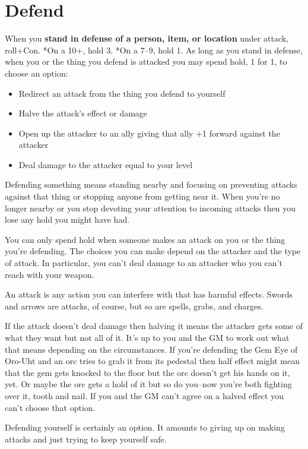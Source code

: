 \section*{Defend}
\HRule
When you \textbf{stand in defense of a person, item, or location}
under attack, roll+Con. *On a 10+, hold 3. *On a 7--9, hold 1. As long as you stand in defense, when you or the thing you defend is attacked you may spend hold, 1 for 1, to choose an option:
\begin{itemize}
\item Redirect an attack from the thing you defend to yourself
\item Halve the attack's effect or damage
\item Open up the attacker to an ally giving that ally +1 forward against the attacker
\item Deal damage to the attacker equal to your level
\end{itemize}
\HRule

Defending something means standing nearby and focusing on preventing attacks against that thing or stopping anyone from getting near it. When you're no longer nearby or you stop devoting your attention to incoming attacks then you lose any hold you might have had.

You can only spend hold when someone makes an attack on you or the thing you're defending. The choices you can make depend on the attacker and the type of attack. In particular, you can't deal damage to an attacker who you can't reach with your weapon.

An attack is any action you can interfere with that has harmful effects. Swords and arrows are attacks, of course, but so are spells, grabs, and charges. 

If the attack doesn't deal damage then halving it means the attacker gets some of what they want but not all of it. It's up to you and the GM to work out what that means depending on the circumstances. If you're defending the Gem Eye of Oro-Uht and an orc tries to grab it from its pedestal then half effect might mean that the gem gets knocked to the floor but the orc doesn't get his hands on it, yet. Or maybe the orc gets a hold of it but so do you--now you're both fighting over it, tooth and nail. If you and the GM can't agree on a halved effect you can't choose that option.

Defending yourself is certainly an option. It amounts to giving up on making attacks and just trying to keep yourself safe.

